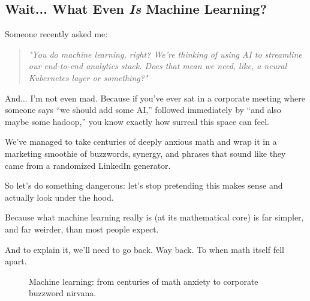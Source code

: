 \subsection{Wait... What Even \textit{Is} Machine Learning?}

Someone recently asked me:

\begin{quote}
\textit{"You do machine learning, right? We’re thinking of using AI to streamline our end-to-end analytics stack. Does that mean we need, like, a neural Kubernetes layer or something?"}
\end{quote}

And... I'm not even mad. Because if you’ve ever sat in a corporate meeting where someone says “we should add some AI,” followed immediately by “and also maybe some hadoop,” you know exactly how surreal this space can feel.

We’ve managed to take centuries of deeply anxious math and wrap it in a marketing smoothie of buzzwords, synergy, and phrases that sound like they came from a randomized LinkedIn generator.

So let’s do something dangerous: let’s stop pretending this makes sense and actually look under the hood.

Because what machine learning really is (at its mathematical core) is far simpler, and far weirder, than most people expect.

And to explain it, we’ll need to go back. Way back. To when math itself fell apart.

\begin{figure}[H]
\centering
{}
\caption{Machine learning: from centuries of math anxiety to corporate buzzword nirvana.}
\end{figure}


